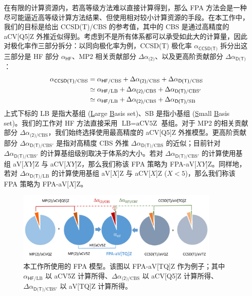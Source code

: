 在有限的计算资源内，若高等级方法难以直接计算得到，那么 FPA 方法会是一种尽可能逼近高等级计算方法结果、但使用相对较小计算资源的手段。在本工作中，我们的目标是给出 CCSD(T)/CBS 的参考值，其中的 CBS 是通过高精度的 aCV[Q5]Z 外推近似得到。考虑到不是所有体系都可以承受如此大的计算量，因此对极化率作三部分拆分：以同向极化率为例，CCSD(T) 极化率 $\alpha_\textsf{CCSD(T)}$ 拆分出这三部分是 HF 部分 $\alpha_\textsf{HF}$、MP2 相关贡献部分 $\Delta \alpha_\textsf{(2)}$、以及更高阶贡献部分 $\Delta \alpha_\textsf{D(T)}$：
\begin{align}
    \alpha_{\textsf{CCSD(T)}/\text{CBS}} &= \alpha_{\textsf{HF}/\text{CBS}} + \Delta \alpha_{\textsf{(2)}/\text{CBS}} + \Delta \alpha_{\textsf{D(T)}/\text{CBS}} \notag\\
    &\simeq \alpha_{\textsf{HF}/\text{LB}} + \Delta \alpha_{\textsf{(2)}/\text{CBS}} + \Delta \alpha_{\textsf{D(T)}/\text{CBS}'} \notag\\
    &\simeq \alpha_{\textsf{HF}/\text{LB}} + \Delta \alpha_{\textsf{(2)}/\text{CBS}} + \Delta \alpha_{\textsf{D(T)}/\text{SB}}
\end{align}
上式下标的 LB 是指大基组 (\underline{L}arge \underline{B}asis set)、SB 是指小基组 (\underline{S}mall \underline{B}asis set)。我们的工作对 HF 方法直接采用 $\text{LB} = \text{aCV5Z}$ 基组。对于 MP2 的相关贡献部分 $\Delta \alpha_{\textsf{(2)}/\text{CBS}}$，我们始终选择使用最高精度的 aCV[Q5]Z 外推模型。更高阶贡献部分 $\Delta \alpha_{\textsf{D(T)}/\text{CBS}'}$ 是指对高精度 CBS 外推 $\Delta \alpha_{\textsf{D(T)}/\text{CBS}}$ 的近似；目前针对 $\Delta \alpha_{\textsf{D(T)}/\text{CBS}'}$ 的计算基组级别取决于体系的大小。若对 $\Delta \alpha_{\textsf{D(T)}/\text{CBS}'}$ 的计算使用基组 aV[$XY$]Z 与 aCV[$XY$]Z，那么我们称该 FPA 策略为 FPA-aV[$XY$]Z。同样地，若对 $\Delta \alpha_{\textsf{D(T)}/\text{LB}}$ 的计算使用基组 aV[$X$]Z 与 aCV[$X$]Z ($X < 5$)，那么我们称该 FPA 策略为 FPA-aV[$X$]Z。

\begin{figure}[ht]
    \centering
    \caption{本工作所使用的 FPA 模型。该图以 FPA-aV[TQ]Z 作为例子；其中 $\alpha_{\textsf{HF}/\text{LB}}$ 以 aCV5Z 计算所得、$\Delta \alpha_{\textsf{(2)}/\text{CBS}}$ 以 aCV[Q5]Z 计算所得、$\Delta \alpha_{\textsf{D(T)}/\text{CBS}'}$ 以 aV[TQ]Z 计算所得。}
    \label{fig.fig-1}
    \includegraphics[width=0.9\textwidth]{assets/fig-1.png}
\end{figure}

